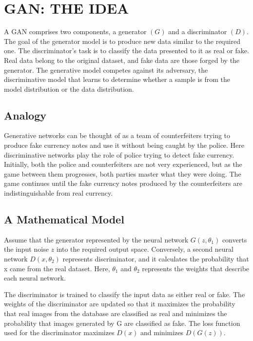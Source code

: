 \chapter{GAN: THE IDEA}
\begin{onehalfspace}
    A GAN comprises two components, a generator $(G)$ and a discriminator $(D)$. 
    The goal of the generator model is to produce new data similar to the required 
    one. The discriminator's task is to classify the data presented to it as real or 
    fake. Real data belong to the original dataset, and fake data are those 
    forged by the generator. The generative model competes against its adversary, 
    the discriminative model that learns to determine whether a sample is from the 
    model distribution or the data distribution.    
\section{Analogy}
    Generative networks can be thought of as a team of counterfeiters trying 
    to produce fake currency notes and use it without being caught by the 
    police. Here discriminative networks play the role of police trying to 
    detect fake currency. Initially, both the police and counterfeiters are not 
    very experienced, but as the game between them progresses, both parties 
    master what they were doing.  The game continues until the fake currency 
    notes produced by the counterfeiters are indistinguishable from real 
    currency.

\section{A Mathematical Model}

    Assume that the generator represented by the neural network 
    \(G(z, \theta_{1})\) converts the input noise \(z\) into the required output 
    space. Conversely, a second neural network \(D(x, \theta_{2})\) represents 
    discriminator, and it calculates the probability that x came from the real 
    dataset. Here, $\theta_{1}$ and $\theta_{2}$ represents the weights that 
    describe each neural network.

    The discriminator is trained to classify the input data as either real or 
    fake. The weights of the discriminator are updated so that it maximizes the 
    probability that real images from the database are classified as real and 
    minimizes the probability that images generated by G are classified as fake. 
    The loss function used for the discriminator maximizes \(D(x)\) and minimizes 
    \(D(G(z))\). 


\end{onehalfspace}
